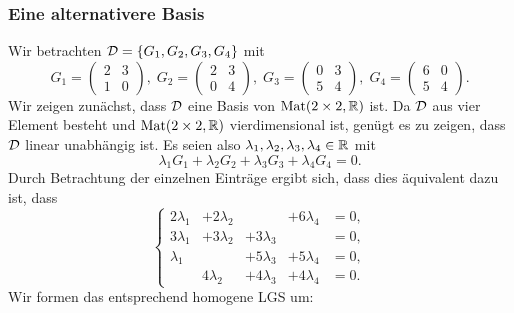 \documentclass[a4paper,10pt]{article}
\begin{document}
\subsubsection{Eine alternativere Basis}
Wir betrachten $\mathcal{D} = \{G_1, G_2, G_3, G_4\}$ mit
\[
 G_1 = \begin{pmatrix} 2 & 3 \\ 1 & 0 \end{pmatrix}, \;
 G_2 = \begin{pmatrix} 2 & 3 \\ 0 & 4 \end{pmatrix}, \;
 G_3 = \begin{pmatrix} 0 & 3 \\ 5 & 4 \end{pmatrix}, \;
 G_4 = \begin{pmatrix} 6 & 0 \\ 5 & 4 \end{pmatrix}.
\]
Wir zeigen zunächst, dass $\mathcal{D}$ eine Basis von $\mathrm{Mat}(2 \times 2, \mathbb{R})$ ist. Da $\mathcal{D}$ aus vier Element besteht und $\mathrm{Mat}(2 \times 2, \mathbb{R})$ vierdimensional ist, genügt es zu zeigen, dass $\mathcal{D}$ linear unabhängig ist. Es seien also $\lambda_1, \lambda_2, \lambda_3, \lambda_4 \in \mathbb{R}$ mit
\[
 \lambda_1 G_1 + \lambda_2 G_2 + \lambda_3 G_3 + \lambda_4 G_4 = 0.
\]
Durch Betrachtung der einzelnen Einträge ergibt sich, dass dies äquivalent dazu ist, dass
\[
 \left\{
  \begin{matrix}
   2\lambda_1 & +2\lambda_2 &             & +6\lambda_4 & = 0, \\
   3\lambda_1 & +3\lambda_2 & +3\lambda_3 &             & = 0, \\
    \lambda_1 &             & +5\lambda_3 & +5\lambda_4 & = 0, \\
              & 4\lambda_2  & +4\lambda_3 & +4\lambda_4 & = 0.
  \end{matrix}
  \right.
\]
Wir formen das entsprechend homogene LGS um:
\end{document}
